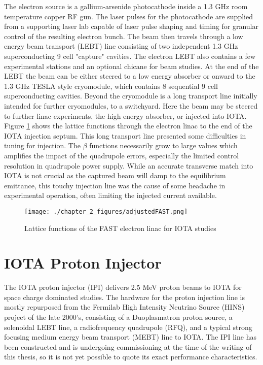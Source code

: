 The electron source is a gallium-arsenide photocathode inside a 1.3 GHz room temperature copper RF gun. The laser pulses for the photocathode are supplied from a supporting laser lab capable of laser pulse shaping and timing for granular control of the resulting electron bunch. The beam then travels through a low energy beam transport (LEBT) line consisting of two independent 1.3 GHz superconducting 9 cell "capture" cavities. The electron LEBT also contains a few experimental stations and an optional chicane for beam studies. At the end of the LEBT the beam can be either steered to a low energy absorber or onward to the 1.3 GHz TESLA style cryomodule, which contains 8 sequential 9 cell superconducting cavities. Beyond the cryomodule is a long transport line initially intended for further cryomodules, to a switchyard. Here the beam may be steered to further linac experiments, the high energy absorber, or injected into IOTA. Figure \ref{fig:linacLat} shows the lattice functions through the electron linac to the end of the IOTA injection septum. This long transport line presented some difficulties in tuning for injection. The $\beta$ functions necessarily grow to large values which amplifies the impact of the quadrupole errors, especially the limited control resolution in quadrupole power supply. While an accurate transverse match into IOTA is not crucial as the captured beam will damp to the equilibrium emittance, this touchy injection line was the cause of some headache in experimental operation, often limiting the injected current available.


\begin{figure}
	\centering
	\texttt{[image: ./chapter\_2\_figures/adjustedFAST.png]}
	\caption{Lattice functions of the FAST electron linac for IOTA studies}
	\label{fig:linacLat}
\end{figure}

\section{IOTA Proton Injector}

The IOTA proton injector (IPI) delivers 2.5 MeV proton beams to IOTA for space charge dominated studies. The hardware for the proton injection line is mostly repurposed from the Fermilab High Intensity Neutrino Source (HINS) \cite{webberOverviewHighIntensity} project of the late 2000's, consisting of a Duoplasmatron proton source, a solenoidal LEBT line, a radiofrequency quadrupole (RFQ), and a typical strong focusing medium energy beam transport (MEBT) line \cite{edstromIOTAProtonInjector2023} to IOTA. The IPI line has been constructed and is undergoing commissioning at the time of the writing of this thesis, so it is not yet possible to quote its exact performance characteristics.

